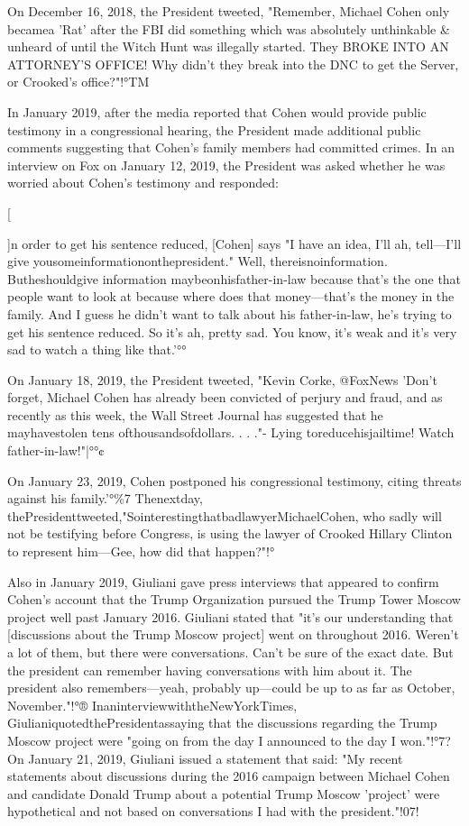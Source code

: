 On December 16, 2018, the President tweeted, "Remember, Michael Cohen only becamea 'Rat' after the FBI did something which was absolutely unthinkable \& unheard of until the Witch Hunt was illegally started.
They BROKE INTO AN ATTORNEY'S OFFICE!
Why didn't they break into the DNC to get the Server, or Crooked's office?"!°TM

In January 2019, after the media reported that Cohen would provide public testimony in a congressional hearing, the President made additional public comments suggesting that Cohen's family members had committed crimes.
In an interview on Fox on January 12, 2019, the President was asked whether he was worried about Cohen's testimony and responded:

[{]n order to get his sentence reduced, [Cohen] says "I have an idea, I'll ah, tell—I'll give yousomeinformationonthepresident."
Well, thereisnoinformation.
Butheshouldgive information maybeonhisfather-in-law because that's the one that people want to look at because where does that money—that's the money in the family.
And I guess he didn't want to talk about his father-in-law, he's trying to get his sentence reduced.
So it's ah, pretty sad.
You know, it's weak and it's very sad to watch a thing like that.'°°

On January 18, 2019, the President tweeted, "Kevin Corke, @FoxNews 'Don't forget, Michael Cohen has already been convicted of perjury and fraud, and as recently as this week, the Wall Street Journal has suggested that he mayhavestolen tens ofthousandsofdollars. . . ."- Lying toreducehisjailtime! Watch father-in-law!"|°°¢

On January 23, 2019, Cohen postponed his congressional testimony, citing threats against his family.'°\%7
Thenextday, thePresidenttweeted,"SointerestingthatbadlawyerMichaelCohen, who sadly will not be testifying before Congress, is using the lawyer of Crooked Hillary Clinton to represent him—Gee, how did that happen?"!°%

Also in January 2019, Giuliani gave press interviews that appeared to confirm Cohen's account that the Trump Organization pursued the Trump Tower Moscow project well past January 2016.
Giuliani stated that "it's our understanding that [discussions about the Trump Moscow project] went on throughout 2016.
Weren't a lot of them, but there were conversations.
Can't be sure of the exact date.
But the president can remember having conversations with him about it.
The president also remembers—yeah, probably up—could be up to as far as October, November."!°®
InaninterviewwiththeNewYorkTimes, GiulianiquotedthePresidentassaying that the discussions regarding the Trump Moscow project were "going on from the day I announced to the day I won."!°7?
On January 21, 2019, Giuliani issued a statement that said: "My recent statements about discussions during the 2016 campaign between Michael Cohen and candidate Donald Trump about a potential Trump Moscow 'project' were hypothetical and not based on conversations I had with the president."!07!

}
